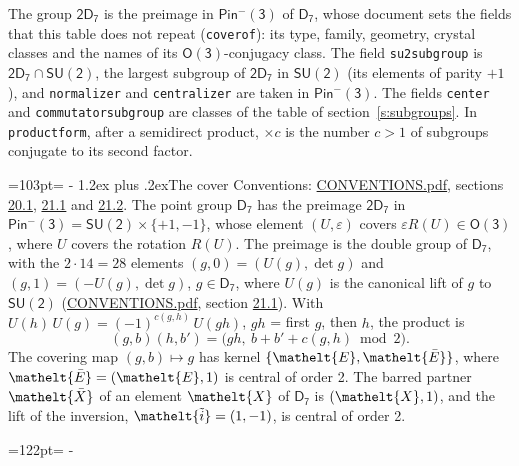 \documentclass[10pt,a4paper]{article}
\makeatletter
\renewcommand\section{\@startsection{section}{1}{\z@}{-3ex plus -1ex minus -.2ex}%
  {1.2ex plus .2ex}{\normalfont\large\sffamily\bfseries\color{parttitle}}}
\newcommand{\needspace}[1]{\par\penalty-100\begingroup\dimen0=#1\relax\dimen2=\pagegoal
  \advance\dimen2-\pagetotal\ifdim\dimen0>\dimen2\relax\ifdim\dimen2>0pt\vfil\break\fi\fi
  \endgroup}
\numberwithin{equation}{section}
\newcommand{\eltfont}[1]{{\let\sigma\eltsigma\mathelt{#1}}}
\newcommand{\grp}[1]{\mathsf{#1}}
\newcommand{\elt}[1]{\eltfont{#1}}
\newcommand{\dirprod}{\times}
\newcommand{\barred}[1]{\bar{#1}}
\newcommand{\lift}[1]{\tilde{#1}}
\makeatother
\begin{document}
\leavevmode\label{n:element.inversion}\label{n:group.preimage}The group $\grp{2D_{7}}$ is the preimage in $\grp{Pin^{-}(3)}$ of \href{../../../rotation/data/pdf/D7.pdf}{$\grp{D_{7}}$}, whose document sets the fields that this table does not repeat (\texttt{coverof}): its type, family, geometry, crystal classes and the names of its \href{../../../rotation/data/pdf/O3.pdf}{$\grp{O(3)}$}-conjugacy class. The field \texttt{su2subgroup} is $\grp{2D_{7}} \cap \grp{SU(2)}$, the largest subgroup of $\grp{2D_{7}}$ in $\grp{SU(2)}$ (its elements of parity $+1$), and \texttt{normalizer} and \texttt{centralizer} are taken in $\grp{Pin^{-}(3)}$. The fields \texttt{center} and \texttt{commutatorsubgroup} are classes of the table of section~\ref{s:subgroups}.
\leavevmode\label{n:index.conjugates.c}In \texttt{productform}, after a semidirect product, ${\times}c$ is the number $c > 1$ of subgroups conjugate to its second factor.
\needspace{103pt}
\section{The cover}\label{s:cover}
Conventions: \href{../../CONVENTIONS.pdf}{CONVENTIONS.pdf}, sections \href{../../CONVENTIONS.pdf\#conv.20.1}{20.1}, \href{../../CONVENTIONS.pdf\#conv.21.1}{21.1} and \href{../../CONVENTIONS.pdf\#conv.21.2}{21.2}.
\leavevmode\label{n:group.pin.minus}\label{n:group.su2}\label{n:local.pin.sign}\label{n:matrix.covered}\label{n:matrix.lift.su2}\label{n:index.bar}The point group $\grp{D_{7}}$ has the preimage $\grp{2D_{7}}$ in $\grp{Pin^{-}(3)} = \grp{SU(2)} \dirprod \{+1, -1\}$, whose element $(U, \varepsilon)$ covers $\varepsilon R(U) \in \grp{O(3)}$, where $U$ covers the rotation $R(U)$. The preimage is the double group of $\grp{D_{7}}$, with the $2 \cdot 14 = 28$ elements $(g, 0) = (U(g), \det g)$ and $(g, 1) = (-U(g), \det g)$, $g \in \grp{D_{7}}$, where $U(g)$ is the canonical lift of $g$ to $\grp{SU(2)}$ (\href{../../CONVENTIONS.pdf}{CONVENTIONS.pdf}, section \href{../../CONVENTIONS.pdf\#conv.21.1}{21.1}). \label{n:function.cocycle}With $U(h)\,U(g) = (-1)^{c(g,h)}\,U(gh)$, $gh$ = first $g$, then $h$, the product is
\begin{equation}\label{e:product}(g, b)(h, b') = \bigl(gh,\ b + b' + c(g, h) \bmod 2\bigr).\end{equation}
\leavevmode\label{n:mark.bar}The covering map $(g, b) \mapsto g$ has kernel $\{\elt{E}, \elt{\barred{E}}\}$, where $\elt{\barred{E}} = (\elt{E}, 1)$ is central of order 2. \label{n:element.named}\label{n:mark.lift}The barred partner $\elt{\barred{X}}$ of an element $\elt{X}$ of $\grp{D_{7}}$ is $(\elt{X}, 1)$, and the lift of the inversion, $\elt{\lift{i}} = (1, -1)$, is central of order 2.
\needspace{122pt}
\end{document}
